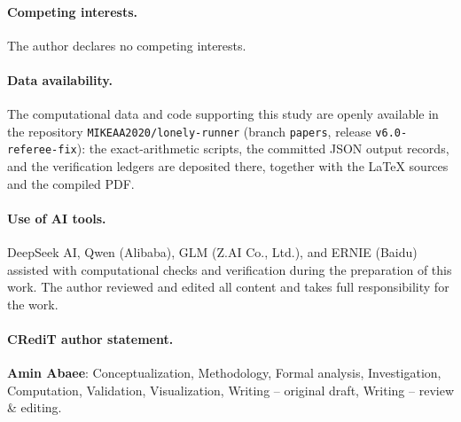 \documentclass[11pt,a4paper]{article}
\numberwithin{equation}{section}
\theoremstyle{plain}
\theoremstyle{definition}
\theoremstyle{remark}
\begin{document}
\paragraph{Competing interests.} The author declares no competing
interests.

\paragraph{Data availability.} The computational data and code
supporting this study are openly available in the repository
\texttt{MIKEAA2020/lonely-runner} (branch \texttt{papers}, release
\texttt{v6.0-referee-fix}): the exact-arithmetic scripts, the committed
JSON output records, and the verification ledgers are deposited there,
together with the \LaTeX{} sources and the compiled PDF.

\paragraph{Use of AI tools.} DeepSeek AI, Qwen (Alibaba), GLM (Z.AI Co.,
Ltd.), and ERNIE (Baidu) assisted with computational checks and
verification during the preparation of this work. The author reviewed and
edited all content and takes full responsibility for the work.

\paragraph{CRediT author statement.} \textbf{Amin Abaee}: Conceptualization,
Methodology, Formal analysis, Investigation, Computation, Validation,
Visualization, Writing -- original draft, Writing -- review \& editing.
\end{document}
